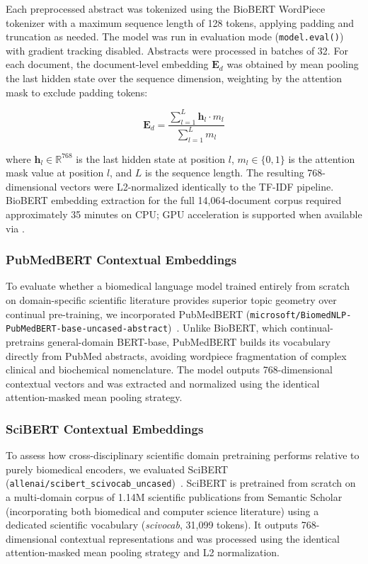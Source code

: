 \documentclass[a4paper,fleqn]{cas-dc}
\begin{document}
Each preprocessed abstract was tokenized using the BioBERT WordPiece tokenizer with a maximum sequence length of 128 tokens, applying padding and truncation as needed. The model was run in evaluation mode (\texttt{model.eval()}) with gradient tracking disabled. Abstracts were processed in batches of 32. For each document, the document-level embedding $\mathbf{E}_d$ was obtained by mean pooling the last hidden state over the sequence dimension, weighting by the attention mask to exclude padding tokens:

\begin{equation}
\mathbf{E}_d = \frac{\sum_{l=1}^{L} \mathbf{h}_l \cdot m_l}{\sum_{l=1}^{L} m_l}
\end{equation}

where $\mathbf{h}_l \in \mathbb{R}^{768}$ is the last hidden state at position $l$, $m_l \in \{0,1\}$ is the attention mask value at position $l$, and $L$ is the sequence length. The resulting 768-dimensional vectors were L2-normalized identically to the TF-IDF pipeline. BioBERT embedding extraction for the full 14,064-document corpus required approximately 35 minutes on CPU; GPU acceleration is supported when available via .

\subsubsection{PubMedBERT Contextual Embeddings}

To evaluate whether a biomedical language model trained entirely from scratch on domain-specific scientific literature provides superior topic geometry over continual pre-training, we incorporated PubMedBERT (\texttt{microsoft/\allowbreak BiomedNLP-\allowbreak PubMedBERT-\allowbreak base-\allowbreak uncased-\allowbreak abstract})~\cite{ref33}. Unlike BioBERT, which continual-pretrains general-domain BERT-base, PubMedBERT builds its vocabulary directly from PubMed abstracts, avoiding wordpiece fragmentation of complex clinical and biochemical nomenclature. The model outputs 768-dimensional contextual vectors and was extracted and normalized using the identical attention-masked mean pooling strategy.

\subsubsection{SciBERT Contextual Embeddings}

To assess how cross-disciplinary scientific domain pretraining performs relative to purely biomedical encoders, we evaluated SciBERT (\texttt{allenai/\allowbreak scibert\_\allowbreak scivocab\_\allowbreak uncased})~\cite{ref37}. SciBERT is pretrained from scratch on a multi-domain corpus of 1.14M scientific publications from Semantic Scholar (incorporating both biomedical and computer science literature) using a dedicated scientific vocabulary (\textit{scivocab}, 31{,}099 tokens). It outputs 768-dimensional contextual representations and was processed using the identical attention-masked mean pooling strategy and L2 normalization.
\end{document}
